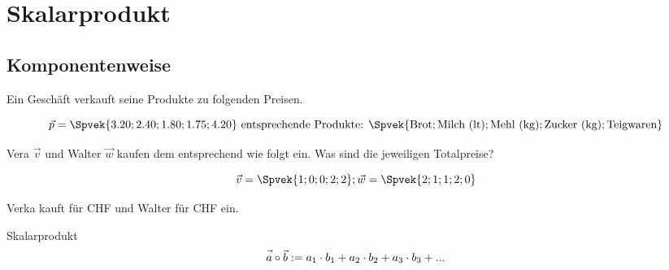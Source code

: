 \section{Skalarprodukt}




\subsection{Komponentenweise}


Ein Geschäft verkauft seine Produkte zu folgenden Preisen.

$$\vec{p} = \Spvek{3.20; 2.40; 1.80; 1.75; 4.20} \text{ entsprechende Produkte: }
\Spvek{\text{Brot};\text{Milch (lt)}; \text{Mehl (kg)}; \text{Zucker
    (kg)}; \text{Teigwaren}}$$

Vera $\vec{v}$ und Walter $\vec{w}$ kaufen dem entsprechend wie folgt ein. Was sind die
jeweiligen Totalpreise?

$$\vec{v} = \Spvek{1;0;0;2;2}; \vec{w} = \Spvek{2;1;1;2;0} $$


\vspace{3mm}
Verka kauft für CHF  und Walter für CHF
 ein.

\newpage

\begin{definition}{Skalarprodukt}{}
  $$\vec{a\vphantom{b}}\circ\vec{b} := a_1\cdot{}b_1 + a_2 \cdot{} b_2
  + a_3\cdot{}b_3 + ...$$
\end{definition}

